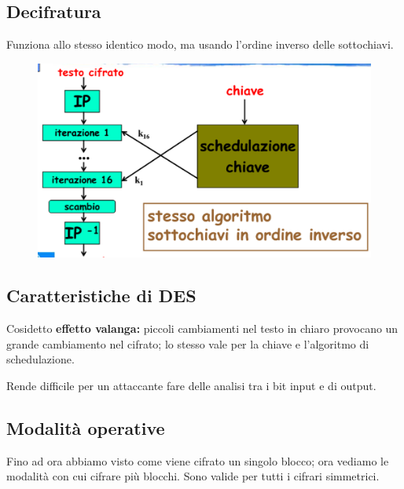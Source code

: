 \subsection{Decifratura}

Funziona allo stesso identico modo, ma usando l'ordine inverso delle sottochiavi.

\begin{figure}[H]
    \centering
    \includegraphics[width=0.8\linewidth]{chapters/chap03/images/des4.png}
\end{figure}

\subsection{Caratteristiche di DES}

Cosidetto \textbf{effetto valanga:} piccoli cambiamenti nel testo in chiaro 
provocano un grande cambiamento nel cifrato; lo stesso vale per la chiave e l'algoritmo 
di schedulazione.

\noindent Rende difficile per un attaccante fare delle analisi tra i bit input e di output.

\subsection{Modalità operative}

Fino ad ora abbiamo visto come viene cifrato un singolo blocco; ora vediamo le modalità 
con cui cifrare più blocchi. Sono valide per tutti i cifrari simmetrici.

